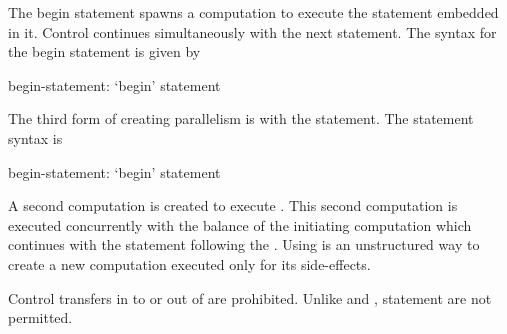 The begin statement spawns a computation to execute the statement
embedded in it.  Control continues simultaneously with the next
statement.  The syntax for the begin statement is given by
\begin{syntax}
begin-statement:
  `begin' statement
\end{syntax}

The third form of creating parallelism is with the 
statement. The  statement syntax is
\begin{syntax}
begin-statement:
  `begin' statement
\end{syntax}
A second computation is created to execute .
This second computation is executed concurrently with the balance of
the initiating computation which continues with the statement
following the . Using  is an unstructured way to 
create a new computation executed only for its side-effects.

Control transfers in to or out of  are prohibited. Unlike
 and ,  statement are not permitted.

